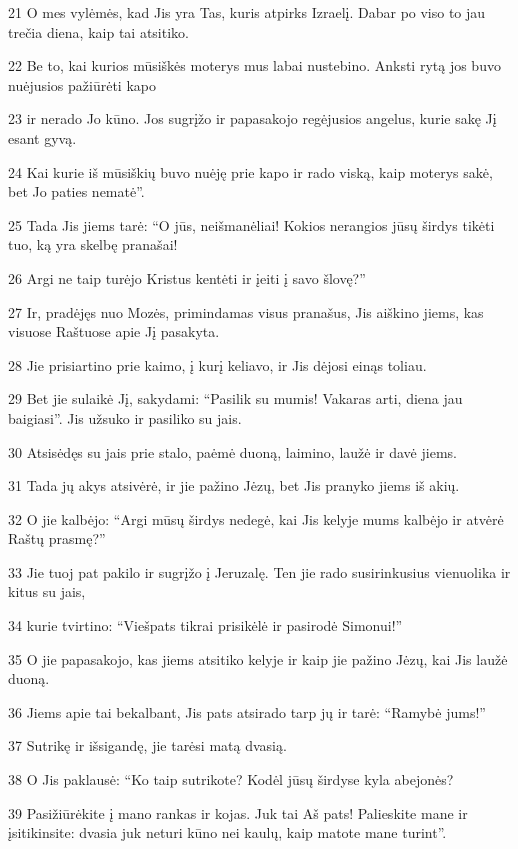 \par 21 O mes vylėmės, kad Jis yra Tas, kuris atpirks Izraelį. Dabar po viso to jau trečia diena, kaip tai atsitiko. 
\par 22 Be to, kai kurios mūsiškės moterys mus labai nustebino. Anksti rytą jos buvo nuėjusios pažiūrėti kapo 
\par 23 ir nerado Jo kūno. Jos sugrįžo ir papasakojo regėjusios angelus, kurie sakę Jį esant gyvą. 
\par 24 Kai kurie iš mūsiškių buvo nuėję prie kapo ir rado viską, kaip moterys sakė, bet Jo paties nematė”. 
\par 25 Tada Jis jiems tarė: “O jūs, neišmanėliai! Kokios nerangios jūsų širdys tikėti tuo, ką yra skelbę pranašai! 
\par 26 Argi ne taip turėjo Kristus kentėti ir įeiti į savo šlovę?” 
\par 27 Ir, pradėjęs nuo Mozės, primindamas visus pranašus, Jis aiškino jiems, kas visuose Raštuose apie Jį pasakyta. 
\par 28 Jie prisiartino prie kaimo, į kurį keliavo, ir Jis dėjosi einąs toliau. 
\par 29 Bet jie sulaikė Jį, sakydami: “Pasilik su mumis! Vakaras arti, diena jau baigiasi”. Jis užsuko ir pasiliko su jais. 
\par 30 Atsisėdęs su jais prie stalo, paėmė duoną, laimino, laužė ir davė jiems. 
\par 31 Tada jų akys atsivėrė, ir jie pažino Jėzų, bet Jis pranyko jiems iš akių. 
\par 32 O jie kalbėjo: “Argi mūsų širdys nedegė, kai Jis kelyje mums kalbėjo ir atvėrė Raštų prasmę?” 
\par 33 Jie tuoj pat pakilo ir sugrįžo į Jeruzalę. Ten jie rado susirinkusius vienuolika ir kitus su jais, 
\par 34 kurie tvirtino: “Viešpats tikrai prisikėlė ir pasirodė Simonui!” 
\par 35 O jie papasakojo, kas jiems atsitiko kelyje ir kaip jie pažino Jėzų, kai Jis laužė duoną. 
\par 36 Jiems apie tai bekalbant, Jis pats atsirado tarp jų ir tarė: “Ramybė jums!” 
\par 37 Sutrikę ir išsigandę, jie tarėsi matą dvasią. 
\par 38 O Jis paklausė: “Ko taip sutrikote? Kodėl jūsų širdyse kyla abejonės? 
\par 39 Pasižiūrėkite į mano rankas ir kojas. Juk tai Aš pats! Palieskite mane ir įsitikinsite: dvasia juk neturi kūno nei kaulų, kaip matote mane turint”. 

